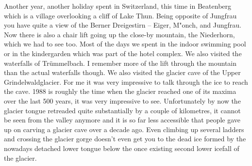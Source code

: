 Another year, another holiday spent in Switzerland, this time in Beatenberg which is a village overlooking a cliff of Lake Thun. Being opposite of Jungfrau you have quite a view of the Berner Dreigestirn -- Eiger, M"onch, and Jungfrau. Now there is also a chair lift going up the close-by mountain, the Niederhorn, which we had to see too. Most of the days we spent in the indoor swimming pool or in the kindergarden which was part of the hotel complex. We also visited the waterfalls of Tr\"ummelbach. I remember more of the lift through the mountain than the actual waterfalls though. We also visited the glacier cave of the Upper Grindelwaldglacier. For me it was very impressive to talk through the ice to reach the cave. 1988 is roughly the time when the glacier reached one of its maxima over the last 500 years, it was very impressive to see. Unfortunately by now the glacier tongue retreaded quite substantially by a couple of kilometres, it cannot be seen from the valley anymore and it is so far less accessible that people gave up on carving a glacier cave over a decade ago. Even climbing up several ladders and crossing the glacier gorge doesn't even get you to the dead ice formed by the nowadays detached lower tongue below the once existing second lower icefall of the glacier.\\


